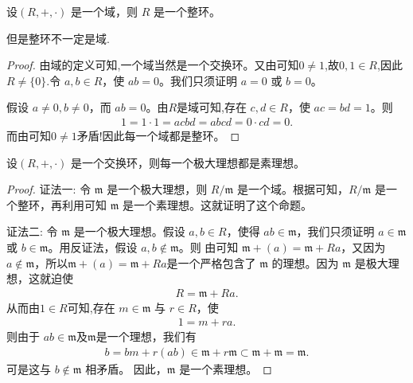 \documentclass[../../main.tex]{subfiles}
\begin{document}
\begin{lemma}[域一定是整环]\label{lemma:域一定是整环}
设$(R, +, \cdot)$ 是一个域，则 $R$ 是一个整环。
\end{lemma}
\begin{remark}
但是整环不一定是域.
\end{remark}
\begin{proof}
由域的定义可知,一个域当然是一个交换环。又由可知$0\ne 1$,故$0,1\in R$,因此$R\ne \{0\}.$令 $a, b \in R$，使 $ab = 0$。我们只须证明 $a = 0$ 或 $b = 0$。

假设 $a \neq 0, b \neq 0$，而 $ab = 0$。由$R$是域可知,存在 $c, d \in R$，使 $ac = bd = 1$。则
\begin{align*}
1 = 1 \cdot 1 = acbd = abcd = 0 \cdot cd = 0.
\end{align*}
而由可知$0\ne 1$矛盾!因此每一个域都是整环。
\end{proof}

\begin{proposition}\label{proposition:在交换环中,每一个极大理想都是素理想}
设$(R, +, \cdot)$ 是一个交换环，则每一个极大理想都是素理想。
\end{proposition}
\begin{proof}
{\color{blue}证法一:}
令 $\mathfrak{m}$ 是一个极大理想，则 $R / \mathfrak{m}$ 是一个域。根据可知，$R / \mathfrak{m}$ 是一个整环，再利用可知 $\mathfrak{m}$ 是一个素理想。这就证明了这个命题。

{\color{blue}证法二:}
令 $\mathfrak{m}$ 是一个极大理想。假设 $a, b \in R$，使得 $ab \in \mathfrak{m}$，我们只须证明 $a \in \mathfrak{m}$ 或 $b \in \mathfrak{m}$。用反证法，假设 $a, b \notin \mathfrak{m}$。则 由可知 $\mathfrak{m}+(a)=\mathfrak{m} + Ra $，又因为 $a \notin \mathfrak{m}$，所以$\mathfrak{m}+(a)=\mathfrak{m} + Ra $是一个严格包含了 $\mathfrak{m}$ 的理想。因为 $\mathfrak{m}$ 是极大理想，这就迫使
\begin{align*}
R = \mathfrak{m} + Ra .
\end{align*}
从而由$1\in R$可知,存在 $m \in \mathfrak{m}$ 与 $r \in R$，使
\begin{align*}
1 = m + ra .
\end{align*}
则由于 $ab \in \mathfrak{m}$及$\mathfrak{m}$是一个理想，我们有
\begin{align*}
b = bm + r(ab) \in \mathfrak{m} + r\mathfrak{m} \subset \mathfrak{m} + \mathfrak{m} = \mathfrak{m} .
\end{align*}
可是这与 $b \notin \mathfrak{m}$ 相矛盾。
因此，$\mathfrak{m}$ 是一个素理想。 
\end{proof}
\end{document}
